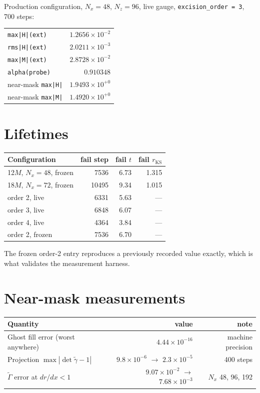\documentclass[11pt,openany]{book}
\newcommand{\Gt}{\tilde{\Gamma}}
\newcommand{\etr}{\tilde{\gamma}}
\begin{document}
Production configuration, $N_x = 48$, $N_z = 96$, live gauge,
\texttt{excision\_order = 3}, 700 steps:
\begin{center}
\begin{tabular}{@{}lr@{}}
\toprule
\texttt{max|H|(ext)} & $1.2656\times10^{-2}$ \\
\texttt{rms|H|(ext)} & $2.0211\times10^{-3}$ \\
\texttt{max|M|(ext)} & $2.8728\times10^{-2}$ \\
\texttt{alpha(probe)} & $0.910348$ \\
near-mask \texttt{max|H|} & $1.9493\times10^{+0}$ \\
near-mask \texttt{max|M|} & $1.4920\times10^{+0}$ \\
\bottomrule
\end{tabular}
\end{center}

\section{Lifetimes}

\begin{center}
\begin{tabular}{@{}lrrr@{}}
\toprule
Configuration & fail step & fail $t$ & fail $r_{\mathrm{KS}}$ \\
\midrule
12$M$, $N_x{=}48$, frozen & 7536 & 6.73 & 1.315 \\
18$M$, $N_x{=}72$, frozen & 10495 & 9.34 & 1.015 \\
\midrule
order 2, live & 6331 & 5.63 & --- \\
order 3, live & 6848 & 6.07 & --- \\
order 4, live & 4364 & 3.84 & --- \\
order 2, frozen & 7536 & 6.70 & --- \\
\bottomrule
\end{tabular}
\end{center}

The frozen order-2 entry reproduces a previously recorded value exactly, which
is what validates the measurement harness.

\section{Near-mask measurements}

\begin{center}
\begin{tabular}{@{}lrr@{}}
\toprule
Quantity & value & note \\
\midrule
Ghost fill error (worst anywhere) & $4.44\times10^{-16}$ & machine precision \\
Projection $\max|\det\etr - 1|$ & $9.8\times10^{-6}$ $\to$ $2.3\times10^{-5}$ & 400 steps \\
$\Gt$ error at $dr/dx < 1$ & $9.07\times10^{-2}$ $\to$ $7.68\times10^{-3}$ & $N_x$ 48, 96, 192 \\
\bottomrule
\end{tabular}
\end{center}
\end{document}
